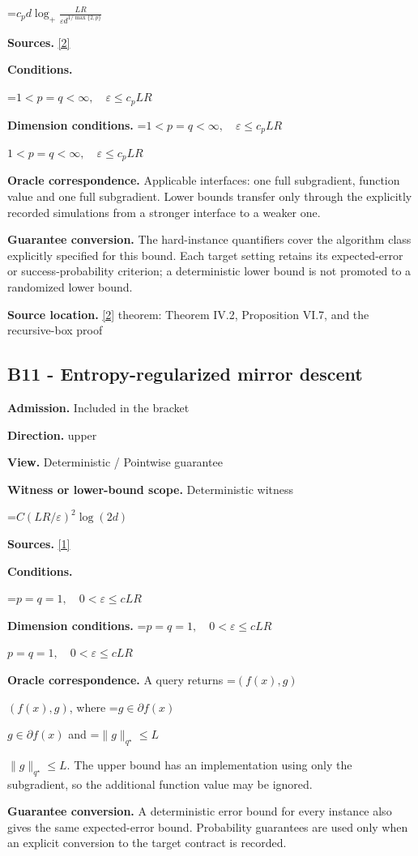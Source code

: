 \documentclass[10pt,a4paper]{article}
\newcommand{\AtlasMath}[1]{\par\begingroup\centering\setbox0=\hbox{$\displaystyle #1$}\ifdim\wd0>1.4\linewidth\typeout{ATLAS WIDE FORMULA: \the\wd0}\fi\ifdim\wd0>\linewidth\resizebox{\linewidth}{!}{\box0}\else\box0\fi\par\endgroup}
\newcommand{\AtlasInlineMath}[1]{\begingroup\setbox0=\hbox{$#1$}\ifdim\wd0>.4\linewidth\endgroup\AtlasMath{#1}\else\endgroup$#1$\fi}
\begin{document}
\AtlasMath{c_p d\log_+\frac{LR}{\varepsilon d^{1/\max\{2,p\}}}}
\textbf{Sources.} \href{https://arxiv.org/pdf/1407.5144}{[2]}

\textbf{Conditions.} 
\AtlasMath{1<p=q<\infty,\quad\varepsilon\le c_p LR}


\textbf{Dimension conditions.} \AtlasInlineMath{1<p=q<\infty,\quad\varepsilon\le c_p LR}

\textbf{Oracle correspondence.} Applicable interfaces: one full subgradient, function value and one full subgradient. Lower bounds transfer only through the explicitly recorded simulations from a stronger interface to a weaker one.

\textbf{Guarantee conversion.} The hard-instance quantifiers cover the algorithm class explicitly specified for this bound. Each target setting retains its expected-error or success-probability criterion; a deterministic lower bound is not promoted to a randomized lower bound.

\textbf{Source location.} \href{https://arxiv.org/pdf/1407.5144}{[2]} theorem: Theorem IV.2, Proposition VI.7, and the recursive-box proof

\subsection{B11 - Entropy-regularized mirror descent}
\textbf{Admission.} Included in the bracket

\textbf{Direction.} upper

\textbf{View.} Deterministic / Pointwise guarantee

\textbf{Witness or lower-bound scope.} Deterministic witness

\AtlasMath{C(LR/\varepsilon)^2\log(2d)}
\textbf{Sources.} \href{https://arxiv.org/pdf/1107.4080}{[1]}

\textbf{Conditions.} 
\AtlasMath{p=q=1,\quad0<\varepsilon\le cLR}


\textbf{Dimension conditions.} \AtlasInlineMath{p=q=1,\quad0<\varepsilon\le cLR}

\textbf{Oracle correspondence.} A query returns \AtlasInlineMath{(f(x),g)}, where \AtlasInlineMath{g\in\partial f(x)} and \AtlasInlineMath{\|g\|_{q^\star}\le L}. The upper bound has an implementation using only the subgradient, so the additional function value may be ignored.

\textbf{Guarantee conversion.} A deterministic error bound for every instance also gives the same expected-error bound. Probability guarantees are used only when an explicit conversion to the target contract is recorded.
\end{document}
